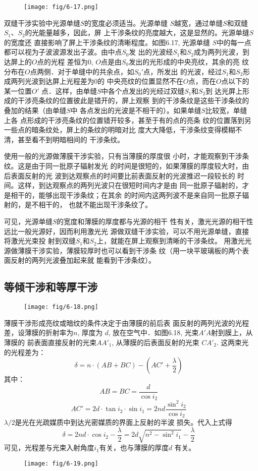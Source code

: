\begin{figure}[htp]
    \centering
     \texttt{[image: fig/6-17.png]}
    \caption{}
\end{figure}

双缝干涉实验中光源单缝$S$的宽度必须适当。光源单缝
$S$越宽，通过单缝$S$和双缝$S_1$、$S_2$的光能量越多，因此，屏
上干涉条纹的亮度越大，这是显然的。光源单缝$S$的宽度还
直接影响了屏上干涉条纹的清晰程度。如图6.17, 光源单缝
$S$中的每一点都可以视为子波波源发出子波。由中点$S_0$发
出的光波经$S_1$和$S_2$成为两列光波，到达屏上的$O$点的光程
差恒为0, $O$点是由$S_0$发出的光形成的中央亮纹，其余的亮
纹分布在$O$点两侧．对于单缝中的共余点，如$S_0'$点，所发出
的光波，经过$S_1$和$S_2$形成两列光波到达屏上光程差为0的
中央亮纹的位置显然不在$O$点，而在$O$点以下的某一位置$O'$
点．这样，由单缝$S$中各个点发出的光经过双缝$S_1$和$S_2$到
达光屏上形成的干涉亮条纹的位置彼此是错开的，屏上观察
到的干涉条纹是这些干涉条纹的叠加的结果（由单缝$S$中
各点发出的光波是不相干的）。如果单缝$S$比较宽，单缝上各
点形成的干涉亮条纹的位置错开较多，甚至于有的点的亮条
纹的位置落到另一些点的暗条纹处，屏上的条纹的明暗对比
度大大降低，干涉条纹变得模糊不清，甚至看不到明暗相间的
干涉条纹。

使用一般的光源做薄膜干涉实验，只有当薄膜的厚度很
小时，才能观察到干涉条纹。这是由于同一批原子辐射发光
的时间是很短的，如果薄膜的厚度较大时，由后表面反射的光
波到达观察点的时间要比前表面反射的光波推迟一段较长的
时间。这样，到达观察点的两列光波只在很短时间内才是由
同一批原子辐射的，才是相干的，能够出现干涉条纹；在其余
的时间内这两列波不是来自同一批原子辐射的，是不相干的，
也就不能出现干涉条纹了。

可见，光源单缝$S$的宽度和薄膜的厚度都与光源的相干
性有关，激光光源的相干性远比一般光源好，因而利用激光光
源做双缝干涉实验，可以不用光源单缝，直接将激光光束投
射到双缝$S_1$和$S_2$上，就能在屏上观察到清晰的干涉条纹。
用激光光源做薄膜干涉实验，薄膜较厚时也可以看到干涉条
纹（用一块平玻璃板的两个表面反射的两列光波叠加起来就
能看到干涉条纹）。

\subsection{等倾干涉和等厚干涉}

\begin{figure}[htp]
    \centering
     \texttt{[image: fig/6-18.png]}
    \caption{}
\end{figure}

薄膜干涉形成亮纹或暗纹的条件决定于由薄膜的前后表
面反射的两列光波的光程差，设薄膜的折射率为$n$, 厚度为
$d$, 放在空气中．如图6.18, 光束$A'A$射到膜上，从薄膜的
前表面直接反射的光束$AA'_1$, 从薄膜的后表面反射的光束
$CA'_2$. 这两束光的光程差为：
\[\delta =n\cdot (AB+BC)-\left(AC'+\frac{\lambda}{2}\right)\]
其中：
\[AB=BC=\frac{d}{\cos i_2}\]
\[AC'=2d\cdot \tan i_2\cdot \sin i_1=2nd \frac{\sin^2 i_2}{\cos i_2}\]
$\lambda/2$是光在光疏媒质中到达光密媒质的界面上反射的半波
损失。代入上式得
\[\delta=2nd\cdot \cos i_2-\frac{\lambda}{2}=2d\sqrt{n^2-\sin^2 i_1}-\frac{\lambda}{2}\]
可见，光程差与光束入射角度$i_1$有关，也与薄膜的厚度$d$
有关。
\begin{figure}[htp]
    \centering
     \texttt{[image: fig/6-19.png]}
    \caption{}
\end{figure}

